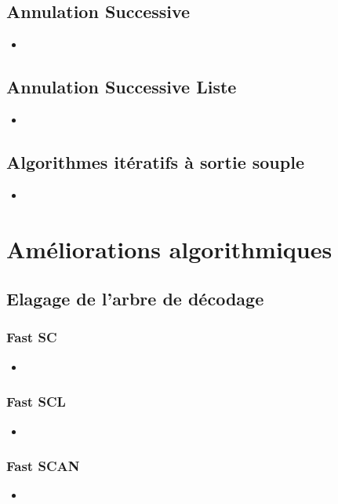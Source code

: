 \subsection{Annulation Successive}
\begin{itemize}
\item 
\end{itemize}
\subsection{Annulation Successive Liste}
\begin{itemize}
\item 
\end{itemize}
\subsection{Algorithmes itératifs à sortie souple}
\begin{itemize}
\item 
\end{itemize}

\section{Améliorations algorithmiques}

\subsection{Elagage de l'arbre de décodage}

\subsubsection{Fast SC}
\begin{itemize}
\item 
\end{itemize}
\subsubsection{Fast SCL}
\begin{itemize}
\item 
\end{itemize}
\subsubsection{Fast SCAN}
\begin{itemize}
\item 
\end{itemize}

